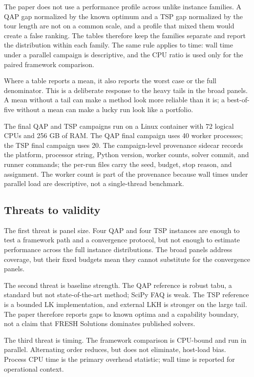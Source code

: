\documentclass[11pt]{article}
\begin{document}
The paper does not use a performance profile across unlike instance families. A QAP gap normalized by
the known optimum and a TSP gap normalized by the tour length are not on a common scale, and a
profile that mixed them would create a false ranking. The tables therefore keep the families separate
and report the distribution within each family. The same rule applies to time: wall time under a
parallel campaign is descriptive, and the CPU ratio is used only for the paired framework comparison.

Where a table reports a mean, it also reports the worst case or the full denominator. This is a
deliberate response to the heavy tails in the broad panels. A mean without a tail can make a method
look more reliable than it is; a best-of-five without a mean can make a lucky run look like a
portfolio.

The final QAP and TSP campaigns run on a Linux container with 72 logical CPUs and 256 GB of RAM. The
QAP final campaign uses 40 worker processes; the TSP final campaign uses 20. The campaign-level
provenance sidecar records the platform, processor string, Python version, worker counts, solver
commit, and runner commands; the per-run files carry the seed, budget, stop reason, and assignment.
The worker count is part of the provenance because wall times under parallel load are descriptive,
not a single-thread benchmark.

\subsection{Threats to validity}

The first threat is panel size. Four QAP and four TSP instances are enough to test a framework path and
a convergence protocol, but not enough to estimate performance across the full instance
distributions. The broad panels address coverage, but their fixed budgets mean they cannot substitute
for the convergence panels.

The second threat is baseline strength. The QAP reference is robust tabu, a standard but not
state-of-the-art method; SciPy FAQ is weak. The TSP reference is a bounded LK implementation, and
external LKH is stronger on the large tail. The paper therefore reports gaps to known optima and a
capability boundary, not a claim that FRESH Solutions dominates published solvers.

The third threat is timing. The framework comparison is CPU-bound and run in parallel. Alternating
order reduces, but does not eliminate, host-load bias. Process CPU time is the primary overhead
statistic; wall time is reported for operational context.
\end{document}
